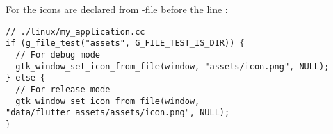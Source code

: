 \noindent For  the icons are declared from -file before the line 
:

\begin{lstlisting}
// ./linux/my_application.cc
if (g_file_test("assets", G_FILE_TEST_IS_DIR)) {
  // For debug mode
  gtk_window_set_icon_from_file(window, "assets/icon.png", NULL); 
} else {
  // For release mode
  gtk_window_set_icon_from_file(window, "data/flutter_assets/assets/icon.png", NULL);
}
\end{lstlisting}
